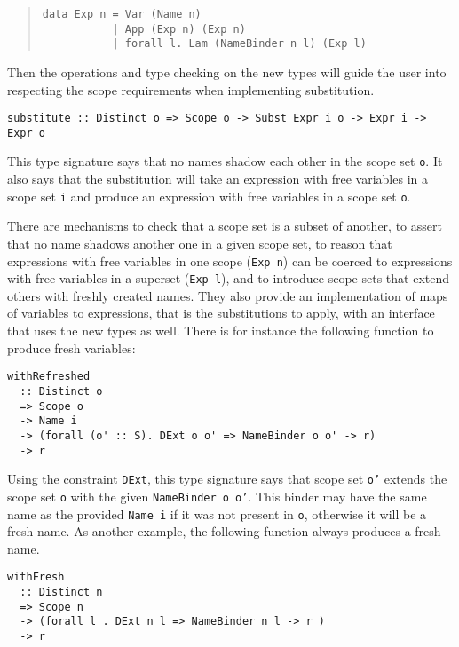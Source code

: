 \documentclass[sigconf]{acmart}
\newcommand{\tc}[1]{{\small\texttt{#1}}}
\begin{document}
\begin{quotation}
\begin{verbatim}
data Exp n = Var (Name n)
           | App (Exp n) (Exp n)
           | forall l. Lam (NameBinder n l) (Exp l)
\end{verbatim}
\end{quotation}

Then the operations and type checking on the new types will guide the user into
respecting the scope requirements when implementing substitution.

\begin{verbatim}
substitute :: Distinct o => Scope o -> Subst Expr i o -> Expr i -> Expr o
\end{verbatim}

This type signature says that no names shadow each other in the scope set \tc{o}.
It also says that the substitution will take an expression with free variables in
a scope set \tc{i} and produce an expression with free variables in a scope set
\tc{o}.

There
are mechanisms to check that a scope set is a subset of another, to assert that no
name shadows another one in a given scope set, to reason that expressions
with free variables in one scope (\tc{Exp n}) can be coerced to expressions with
free variables in a superset (\tc{Exp l}), and to introduce scope sets that extend
others with freshly created names. They also provide an implementation of maps of
variables to expressions, that is the substitutions to apply, with an interface
that uses the new types as well. There is for instance the following function to
produce fresh variables:

\begin{verbatim}
withRefreshed
  :: Distinct o
  => Scope o
  -> Name i
  -> (forall (o' :: S). DExt o o' => NameBinder o o' -> r)
  -> r
\end{verbatim}

Using the constraint \tc{DExt}, this type signature says that scope set \tc{o'}
extends the scope set \tc{o} with the given \tc{NameBinder o o'}. This binder
may have the same name as the provided \tc{Name i} if it was not present in
\tc{o}, otherwise it will be a fresh name. As another example, the following
function always produces a fresh name.

\begin{verbatim}
withFresh
  :: Distinct n
  => Scope n
  -> (forall l . DExt n l => NameBinder n l -> r )
  -> r
\end{verbatim}
\end{document}
